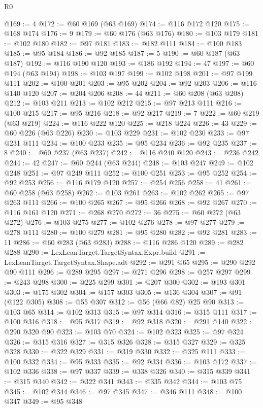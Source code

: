 \begin{lexlean}{R0}
\begin{coremodule}
@169 := 4
@172 := @60 @169 (@63 @169)
@174 := @116 @172 @120
@175 := @168 @174
@176 := 9
@179 := @60 @176 (@63 @176)
@180 := @103 @179
@181 := @102 @180
@182 := @97 @181
@183 := @182 @111
@184 := @100 @183
@185 := @95 @184
@186 := @92 @185
@187 := 5
@190 := @60 @187 (@63 @187)
@192 := @116 @190 @120
@193 := @186 @192
@194 := 47
@197 := @60 @194 (@63 @194)
@198 := @103 @197
@199 := @102 @198
@201 := @97 @199 @111
@202 := @100 @201
@203 := @95 @202
@204 := @92 @203
@206 := @116 @140 @120
@207 := @204 @206
@208 := 44
@211 := @60 @208 (@63 @208)
@212 := @103 @211
@213 := @102 @212
@215 := @97 @213 @111
@216 := @100 @215
@217 := @95 @216
@218 := @92 @217
@219 := 7
@222 := @60 @219 (@63 @219)
@224 := @116 @222 @120
@225 := @218 @224
@226 := 43
@229 := @60 @226 (@63 @226)
@230 := @103 @229
@231 := @102 @230
@233 := @97 @231 @111
@234 := @100 @233
@235 := @95 @234
@236 := @92 @235
@237 := 8
@240 := @60 @237 (@63 @237)
@242 := @116 @240 @120
@243 := @236 @242
@244 := 42
@247 := @60 @244 (@63 @244)
@248 := @103 @247
@249 := @102 @248
@251 := @97 @249 @111
@252 := @100 @251
@253 := @95 @252
@254 := @92 @253
@256 := @116 @179 @120
@257 := @254 @256
@258 := 41
@261 := @60 @258 (@63 @258)
@262 := @103 @261
@263 := @102 @262
@265 := @97 @263 @111
@266 := @100 @265
@267 := @95 @266
@268 := @92 @267
@270 := @116 @161 @120
@271 := @268 @270
@272 := 36
@275 := @60 @272 (@63 @272)
@276 := @103 @275
@277 := @102 @276
@278 := @97 @277
@279 := @278 @111
@280 := @100 @279
@281 := @95 @280
@282 := @92 @281
@283 := 11
@286 := @60 @283 (@63 @283)
@288 := @116 @286 @120
@289 := @282 @288
@290 := LexLeanTarget.TargetSyntax.Expr.build
@291 := LexLeanTarget.TargetSyntax.Shape.adt
@292 := @291 @65
@295 := @290 @292 @90 @111
@296 := @289 @295
@297 := @271 @296
@298 := @257 @297
@299 := @243 @298
@300 := @225 @299
@301 := @207 @300
@302 := @193 @301
@303 := @175 @302
@304 := @157 @303
@305 := @136 @304
@307 := @91 (@122 @305)
@308 := @55 @307
@312 := @56 (@66 @82) @25 @90
@313 := @103 @65
@314 := @102 @313
@315 := @97 @314
@316 := @315 @111
@317 := @100 @316
@318 := @95 @317
@319 := @92 @318
@320 := @291 @140
@322 := @290 @320 @90
@323 := @103 @70
@324 := @102 @323
@325 := @97 @324
@326 := @315 @316
@327 := @315 @326
@328 := @315 @327
@329 := @325 @328
@330 := @322 @329
@331 := @319 @330
@332 := @325 @111
@333 := @100 @332
@334 := @95 @333
@335 := @92 @334
@336 := @103 @172
@337 := @102 @336
@338 := @97 @337
@339 := @338 @326
@340 := @315 @339
@341 := @315 @340
@342 := @322 @341
@343 := @335 @342
@344 := @103 @75
@345 := @102 @344
@346 := @97 @345
@347 := @346 @111
@348 := @100 @347
@349 := @95 @348

\end{coremodule}
\end{lexlean}
